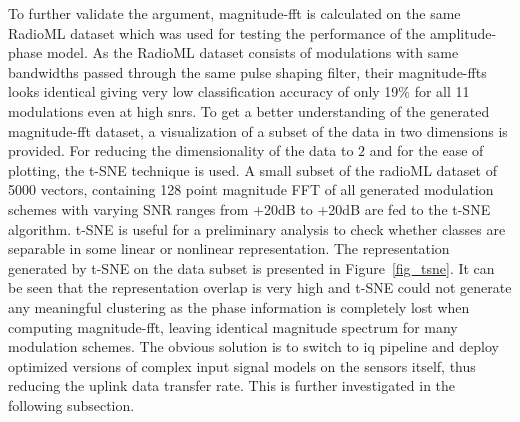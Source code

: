 To further validate the argument, magnitude-\ac{fft} is calculated on the same RadioML dataset which was used for testing the performance of the amplitude-phase model. As the RadioML dataset consists of modulations with same bandwidths passed through the same pulse shaping filter, their magnitude-\ac{fft}s looks identical giving very low classification accuracy of only 19\% for all 11 modulations even at high \ac{snr}s. To get a better understanding of the generated magnitude-\ac{fft} dataset, a visualization of a subset of the data in two dimensions is provided. For reducing the dimensionality of the data to $2$ and for the ease of plotting, the t-SNE technique \cite{tsne} is used. A small subset of the radioML dataset of 5000 vectors, containing 128 point magnitude FFT of all generated modulation schemes with varying SNR ranges from +20dB to +20dB are fed to the t-SNE algorithm. t-SNE is useful for a preliminary analysis to check whether classes are separable in some linear or nonlinear representation. The representation generated by t-SNE on the data subset is presented in Figure~\ref{fig_tsne}. It can be seen that the representation overlap is very high and t-SNE could not generate any meaningful clustering as the phase information is completely lost when computing magnitude-\ac{fft}, leaving identical magnitude spectrum for many modulation schemes. The obvious solution is to switch to \ac{iq} pipeline and deploy optimized versions of complex input signal models on the sensors itself, thus reducing the uplink data transfer rate. This is further investigated in the following subsection.

